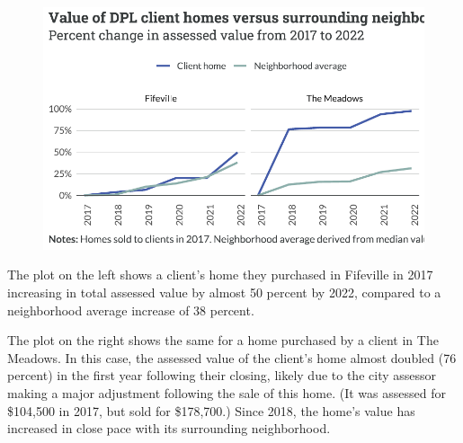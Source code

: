 \documentclass[
  letterpaper,
  DIV=11,
  numbers=noendperiod]{scrartcl}
\begin{document}
\begin{figure}[H]

{\centering \includegraphics{piedmont_files/figure-pdf/equity-assess-plot-1.pdf}

}

\end{figure}

The plot on the left shows a client's home they purchased in Fifeville
in 2017 increasing in total assessed value by almost 50 percent by 2022,
compared to a neighborhood average increase of 38 percent.

The plot on the right shows the same for a home purchased by a client in
The Meadows. In this case, the assessed value of the client's home
almost doubled (76 percent) in the first year following their closing,
likely due to the city assessor making a major adjustment following the
sale of this home. (It was assessed for \$104,500 in 2017, but sold for
\$178,700.) Since 2018, the home's value has increased in close pace
with its surrounding neighborhood.
\end{document}
